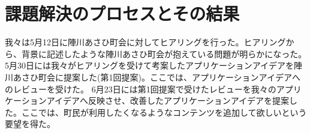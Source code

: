 \section{課題解決のプロセスとその結果}
我々は5月12日に陣川あさひ町会に対してヒアリングを行った。ヒアリングから、背景に記述したような陣川あさひ町会が抱えている問題が明らかになった。
5月30日には我々がヒアリングを受けて考案したアプリケーションアイデアを陣川あさひ町会に提案した(第1回提案)。ここでは、アプリケーションアイデアへのレビューを受けた。
6月23日には第1回提案で受けたレビューを我々のアプリケーションアイデアへ反映させ、改善したアプリケーションアイデアを提案した。ここでは、町民が利用したくなるようなコンテンツを追加して欲しいという要望を得た。
